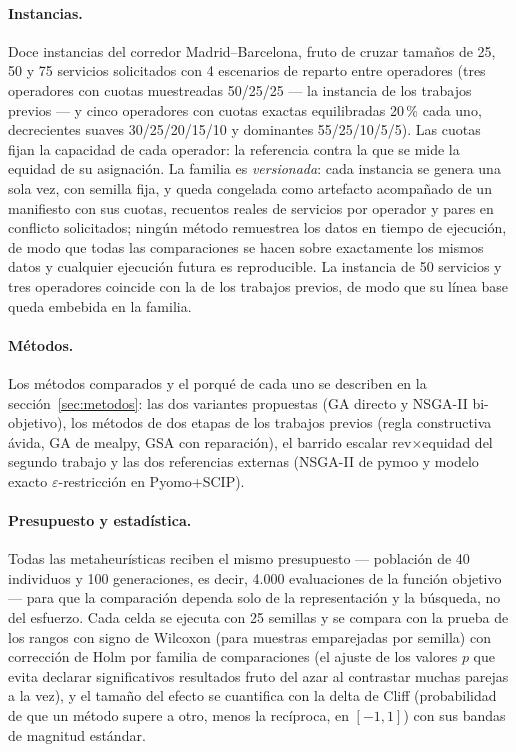 \documentclass[11pt,a4paper]{article}
\begin{document}
\paragraph{Instancias.} Doce instancias del corredor Madrid--Barcelona,
fruto de cruzar tamaños de 25, 50 y 75 servicios solicitados con 4
escenarios de reparto entre operadores (tres operadores con cuotas
muestreadas 50/25/25 --- la instancia de los trabajos previos --- y cinco
operadores con cuotas exactas equilibradas 20\,\% cada uno, decrecientes
suaves 30/25/20/15/10 y dominantes 55/25/10/5/5). Las cuotas fijan la
capacidad de cada operador: la referencia contra la que se mide la equidad
de su asignación. La familia es \emph{versionada}: cada instancia se genera
una sola vez, con semilla fija, y queda congelada como artefacto acompañado
de un manifiesto con sus cuotas, recuentos reales de servicios por operador
y pares en conflicto solicitados; ningún método remuestrea los datos en
tiempo de ejecución, de modo que todas las comparaciones se hacen sobre
exactamente los mismos datos y cualquier ejecución futura es reproducible.
La instancia de 50 servicios y tres operadores coincide con la de los
trabajos previos, de modo que su línea base queda embebida en la familia.

\paragraph{Métodos.} Los métodos comparados y el porqué de cada uno se
describen en la sección~\ref{sec:metodos}: las dos variantes propuestas
(GA directo y NSGA-II bi-objetivo), los métodos de dos etapas de los
trabajos previos (regla constructiva ávida, GA de mealpy, GSA con
reparación), el barrido escalar rev$\times$equidad del segundo trabajo y
las dos referencias externas (NSGA-II de pymoo y modelo exacto
$\varepsilon$-restricción en Pyomo+SCIP).

\paragraph{Presupuesto y estadística.} Todas las metaheurísticas reciben el
mismo presupuesto --- población de 40 individuos y 100 generaciones, es
decir, 4.000 evaluaciones de la función objetivo --- para que la
comparación dependa solo de la representación y la búsqueda, no del
esfuerzo. Cada celda se ejecuta con 25 semillas y se compara con la prueba
de los rangos con signo de Wilcoxon (para muestras emparejadas por semilla)
con corrección de Holm por familia de comparaciones (el ajuste de los
valores $p$ que evita declarar significativos resultados fruto del azar al
contrastar muchas parejas a la vez), y el tamaño del efecto se cuantifica
con la delta de Cliff (probabilidad de que un método supere a otro,
menos la recíproca, en $[-1, 1]$) con sus bandas de magnitud estándar.
\end{document}
